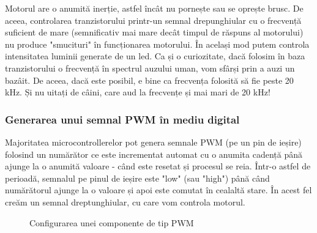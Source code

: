 Motorul are o anumită inerție, astfel încât nu pornește sau se oprește brusc. De aceea, controlarea tranzistorului printr-un semnal drepunghiular cu o frecvență suficient de mare (semnificativ mai mare decât timpul de răspuns al motorului) nu produce "smucituri" în funcționarea motorului. În același mod putem controla intensitatea luminii generate de un led. Ca și o curiozitate, dacă folosim în baza tranzistorului o frecvență în spectrul auzului uman, vom sfârși prin a auzi un bazâit. De aceea, dacă este posibil, e bine ca frecvența folosită să fie peste 20 kHz. Și nu uitați de câini, care aud la frecvențe și mai mari de 20 kHz!

\subsubsection{Generarea unui semnal PWM în mediu digital}

Majoritatea microcontrollerelor pot genera semnale PWM (pe un pin de ieșire) folosind un numărător ce este incrementat automat cu o anumita cadență până ajunge la o anumită valoare - când este resetat și procesul se reia. Într-o astfel de perioadă, semnalul pe pinul de ieșire este "low" (sau "high") până când numărătorul ajunge la o valoare și apoi este comutat în cealaltă stare. În acest fel creăm un semnal dreptunghiular, cu care vom controla motorul.

\begin{figure}
    \vspace{-20pt}
    \vspace{-15pt}
    \caption{\label{fig:CodeWarrior-PExPWM} Configurarea unei componente de tip PWM}
    \vspace{-30pt}
\end{figure}

